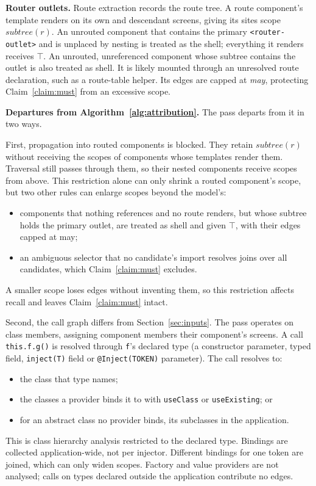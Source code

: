 \textbf{Router outlets.} Route extraction records the route tree. A route component's template
renders on its own and descendant screens, giving its sites scope $\mathit{subtree}(r)$.
An unrouted component that contains the primary \texttt{<router-outlet>} and is unplaced by
nesting is treated as the shell; everything it renders receives $\top$. An unrouted,
unreferenced component whose subtree contains the outlet is also treated as shell. It is
likely mounted through an unresolved route declaration, such as a route-table helper.
Its edges are capped at \emph{may}, protecting Claim~\ref{claim:must} from an excessive scope.

\textbf{Departures from Algorithm~\ref{alg:attribution}.} The pass departs from it in two ways.

First, propagation into routed components is blocked. They retain $\mathit{subtree}(r)$
without receiving the scopes of components whose templates render them. Traversal still
passes through them, so their nested components receive scopes from above. This restriction
alone can only shrink a routed component's scope, but two other rules can enlarge scopes beyond
the model's:
\begin{itemize}
\item components that nothing references and no route renders, but whose subtree holds the
primary outlet, are treated as shell and given $\top$, with their edges capped at may;
\item an ambiguous selector that no candidate's import resolves joins over all candidates, which
Claim~\ref{claim:must} excludes.
\end{itemize}
A smaller scope loses edges without inventing them, so this restriction affects recall
and leaves Claim~\ref{claim:must} intact.

Second, the call graph differs from Section~\ref{sec:inputs}. The pass operates on class
members, assigning component members their component's screens. A call \texttt{this.f.g()}
is resolved through \texttt{f}'s declared type (a constructor
parameter, typed field, \texttt{inject(T)} field or \texttt{@Inject(TOKEN)} parameter). The call resolves to:
\begin{itemize}
\item the class that type names;
\item the classes a provider binds it to with \texttt{useClass} or \texttt{useExisting}; or
\item for an abstract class no provider binds, its subclasses in the application.
\end{itemize} This is class hierarchy analysis \cite{dean1995cha} restricted to the declared type. Bindings are collected application-wide, not per injector. Different bindings for one
token are joined, which can only widen scopes. Factory and value providers are not analysed;
calls on types declared outside the application contribute no edges.

